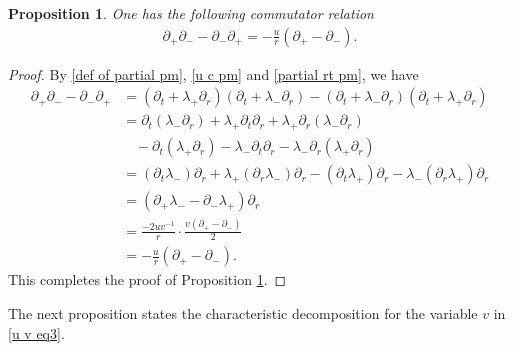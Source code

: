 \documentclass[10pt,leqno]{amsart}
\numberwithin{equation}{section}
\newtheorem{prop}{Proposition}[section]
\begin{document}
\begin{prop} \label{prop1}
	One has the following commutator relation
	\begin{equation} \label{commutator prop}
		\begin{aligned}
			\partial_{+} \partial_{-} - \partial_{-} \partial_{+} = - \frac{u}{r} (\partial_{+} - \partial_{-}).
		\end{aligned}
	\end{equation}
	
\end{prop}

\begin{proof}
	By \eqref{def of partial pm}, \eqref{u c pm} and \eqref{partial rt pm}, we have
	\begin{equation*} 
		\begin{aligned}
			\partial_{+} \partial_{-} - \partial_{-} \partial_{+} & = ( \partial_{t} + \lambda_+ \partial_{r} ) ( \partial_{t} + \lambda_- \partial_{r} ) - ( \partial_{t} + \lambda_- \partial_{r} ) ( \partial_{t} + \lambda_+ \partial_{r} ) \\
			& =  \partial_{t} (\lambda_- \partial_{r}) + \lambda_+ \partial_{t} \partial_{r} + \lambda_+ \partial_{r} (\lambda_- \partial_{r}) \\
			& \ \ \ \ - \partial_{t} (\lambda_+ \partial_{r}) -\lambda_- \partial_{t} \partial_{r} - \lambda_- \partial_{r} (\lambda_+ \partial_{r}) \\
			& = ( \partial_{t}\lambda_- ) \partial_{r} + \lambda_+ ( \partial_{r}\lambda_- ) \partial_{r} - ( \partial_{t}\lambda_+ ) \partial_{r} - \lambda_- ( \partial_{r}\lambda_+ ) \partial_{r} \\
			& = ( \partial_{+}\lambda_- - \partial_{-}\lambda_+) \partial_{r} \\
			& = \frac{-2uv^{-1}}{r} \cdot \frac{v(\partial_{+} - \partial_{-})}{2} \\
			&= - \frac{u}{r} (\partial_{+} - \partial_{-}).
		\end{aligned}
	\end{equation*}
	This completes the proof of Proposition \ref{prop1}.	
\end{proof}

The next proposition states the characteristic decomposition for the variable $v$ in \eqref{u v eq3}.
\end{document}
